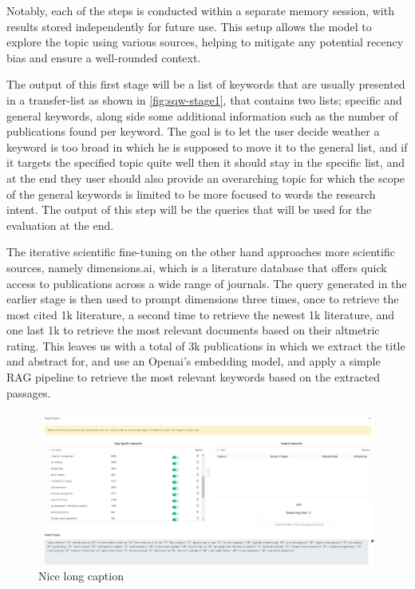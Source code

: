 Notably, each of the steps is conducted within a separate memory session, with results stored independently for future use. This setup allows the model to explore the topic using various sources, helping to mitigate any potential recency bias and ensure a well-rounded context.

The output of this first stage will be a list of keywords that are usually presented in a transfer-list as shown in \autoref{fig:sqw-stage1}, that contains two lists; specific and general keywords, along side some additional information such as the number of publications found per keyword. The goal is to let the user decide weather a keyword is too broad in which he is supposed to move it to the general list, and if it targets the specified topic quite well then it should stay in the specific list, and at the end they user should also provide an overarching topic for which the scope of the general keywords is limited to be more focused to words the research intent. The output of this step will be the queries that will be used for the evaluation at the end.

The iterative scientific fine-tuning on the other hand approaches more scientific sources, namely dimensions.ai, which is a literature database that offers quick access to publications across a wide range of journals. The query generated in the earlier stage is then used to prompt dimensions three times, once to retrieve the most cited 1k literature, a second time to retrieve the newest 1k literature, and one last 1k to retrieve the most relevant documents based on their altmetric rating. This leaves us with a total of 3k publications in which we extract the title and abstract for, and use an Openai's embedding model, and apply a simple RAG pipeline to retrieve the most relevant keywords based on the extracted passages.


\begin{figure}
	\centering
	\includegraphics[scale=0.3]{pics/sqw-stage1.png}
	\caption[Nice short caption]{Nice long caption}
	\label{fig:sqw-stage1}
\end{figure}

